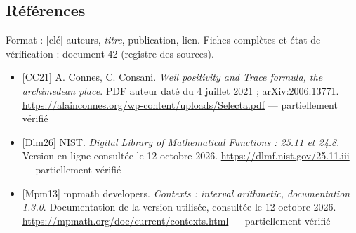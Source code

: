 \documentclass[
  10pt,
  a4paper,
]{article}
\providecommand{\tightlist}{%
  \setlength{\itemsep}{0pt}\setlength{\parskip}{0pt}}
\begin{document}
\hypertarget{ruxe9fuxe9rences}{%
\subsection{Références}\label{ruxe9fuxe9rences}}

Format : {[}clé{]} auteurs, \emph{titre}, publication, lien. Fiches
complètes et état de vérification : document 42 (registre des sources).

\begin{itemize}
\tightlist
\item
  {[}CC21{]} A. Connes, C. Consani. \emph{Weil positivity and Trace
  formula, the archimedean place}. PDF auteur daté du 4 juillet 2021 ;
  arXiv:2006.13771.
  \url{https://alainconnes.org/wp-content/uploads/Selecta.pdf} ---
  partiellement vérifié
\item
  {[}Dlm26{]} NIST. \emph{Digital Library of Mathematical Functions :
  25.11 et 24.8}. Version en ligne consultée le 12 octobre 2026.
  \url{https://dlmf.nist.gov/25.11.iii} --- partiellement vérifié
\item
  {[}Mpm13{]} mpmath developers. \emph{Contexts : interval arithmetic,
  documentation 1.3.0}. Documentation de la version utilisée, consultée
  le 12 octobre 2026. \url{https://mpmath.org/doc/current/contexts.html}
  --- partiellement vérifié
\end{itemize}
\end{document}
